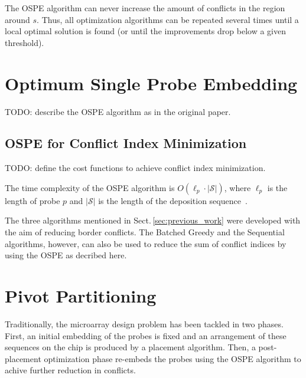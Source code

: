 \documentclass{llncs}
\begin{document}
The OSPE algorithm can never increase the amount of conflicts in the region
around $s$. Thus, all optimization algorithms can be repeated several times until
a local optimal solution is found (or until the improvements drop below a given threshold).

\section{Optimum Single Probe Embedding}
\label{sec:ospe}

TODO: describe the OSPE algorithm as in the original paper.

\subsection{OSPE for Conflict Index Minimization}
\label{sec:ospe_ci}

TODO: define the cost functions to achieve conflict index minimization.

The time complexity of the OSPE algorithm is $O(\ell_p \cdot |\mathcal{S}|)$,
where $\ell_p$ is the length of probe $p$ and $|\mathcal{S}|$ is the length of
the deposition sequence~\cite{KAHNG02}.

The three algorithms mentioned in Sect.\,\ref{sec:previous_work} were developed with
the aim of reducing border conflicts. The Batched Greedy and the Sequential algorithms,
however, can also be used to reduce the sum of conflict indices by using the OSPE as
decribed here.

\section{Pivot Partitioning}
\label{sec:pivotpart}

Traditionally, the microarray design problem has been tackled in two phases. First,
an initial embedding of the probes is fixed and an arrangement of these sequences
on the chip is produced by a placement algorithm. Then, a post-placement optimization
phase re-embeds the probes using the OSPE algorithm to achive further reduction in
conflicts.
\end{document}
